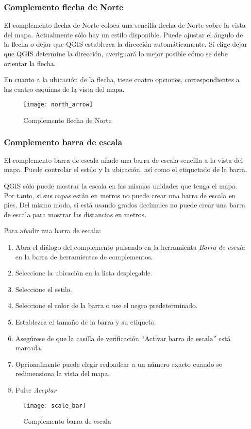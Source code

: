 \subsubsection{Complemento flecha de Norte}

El complemento flecha de Norte coloca una sencilla flecha de Norte sobre la vista del mapa. Actualmente sólo hay un estilo disponible. Puede ajustar el ángulo de la flecha o dejar que QGIS establezca la dirección automáticamente. Si elige dejar que QGIS determine la dirección, averiguará lo mejor posible cómo se debe orientar la flecha.

En cuanto a la ubicación de la flecha, tiene cuatro opciones, correspondientes a las cuatro esquinas de la vista del mapa.

\begin{figure}[ht]
   \begin{center}
   \caption{Complemento flecha de Norte}\label{fig:north_arrow}\smallskip
   \texttt{[image: north\_arrow]}
\end{center}  
\end{figure}

\subsubsection{Complemento barra de escala}
El complemento barra de escala añade una barra de escala sencilla a la vista del mapa. Puede controlar el estilo y la ubicación, así como el etiquetado de la barra.

QGIS sólo puede mostrar la escala en las mismas unidades que tenga el mapa. Por tanto, si sus capas están en metros no puede crear una barra de escala en pies. Del mismo modo, si está usando grados decimales no puede crear una barra de escala para mostrar las distancias en metros.

Para añadir una barra de escala:

\begin{enumerate}
\item Abra el diálogo del complemento pulsando en la herramienta \textsl{Barra de escala} en la barra de herramientas de complementos.
\item Seleccione la ubicación en la lista desplegable.
\item Seleccione el estilo.
\item Seleccione el color de la barra o use el negro predeterminado.
\item Establezca el tamaño de la barra y su etiqueta.
\item Asegúrese de que la casilla de verificación ``Activar barra de escala'' está marcada.
\item Opcionalmente puede elegir redondear a un número exacto cuando se redimensiona la vista del mapa.
\item Pulse \textsl{Aceptar} 
\end{enumerate} 

\begin{figure}[ht]
   \begin{center}
   \caption{Complemento barra de escala}\label{fig:scale_bar}\smallskip
   \texttt{[image: scale\_bar]}
\end{center}  
\end{figure}

